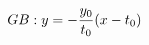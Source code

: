 \documentclass[preview]{standalone}
\begin{document}
\begin{align*}
\special{dvisvgm:raw <g id='unique000'>}GB: y=-\frac{y_0}{t_0}(x-t_0)\special{dvisvgm:raw </g>}
\end{align*}
\end{document}
